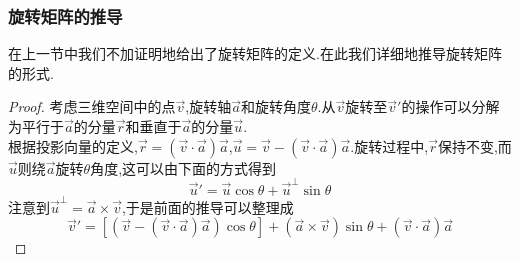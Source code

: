 \documentclass{ctexart}
\begin{document}
\subsubsection{旋转矩阵的推导}
在上一节中我们不加证明地给出了旋转矩阵的定义.在此我们详细地推导旋转矩阵的形式.
\begin{proof}
    考虑三维空间中的点$\vec{v}$,旋转轴$\vec{a}$和旋转角度$\theta$.从$\vec{v}$旋转至$\vec{v}'$的操作可以分解为平行于$\vec{a}$的分量$\vec{r}$和垂直于$\vec{a}$的分量$\vec{u}$.\\
    根据投影向量的定义,$\vec{r}=(\vec{v}\cdot\vec{a})\vec{a}$,$\vec{u}=\vec{v}-(\vec{v}\cdot\vec{a})\vec{a}$.旋转过程中,$\vec{r}$保持不变,而$\vec{u}$则绕$\vec{a}$旋转$\theta$角度,这可以由下面的方式得到
    \[\vec{u}'=\vec{u}\cos\theta+\vec{u}^{\bot}\sin\theta\]
    注意到$\vec{u}^\bot=\vec{a}\times\vec{v}$,于是前面的推导可以整理成
    \[\vec{v}'=\left[\left(\vec{v}-(\vec{v}\cdot\vec{a})\vec{a}\right)\cos\theta\right]+(\vec{a}\times\vec{v})\sin\theta+(\vec{v}\cdot\vec{a})\vec{a}\]
\end{proof}
\end{document}
